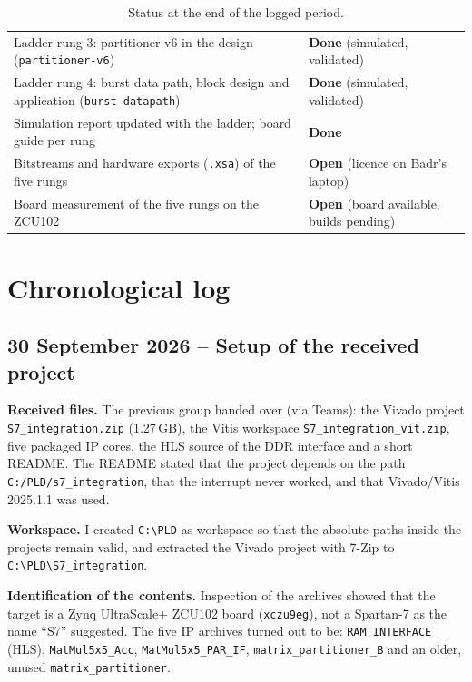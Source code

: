 \documentclass[11pt,a4paper]{article}
\newcommand{\code}[1]{\texttt{#1}}
\newcommand{\ok}{\textcolor{okgreen}{\textbf{Done}}}
\newcommand{\open}{\textcolor{warnorange}{\textbf{Open}}}
\begin{document}
\begin{table}[H]
\begin{tabularx}{\textwidth}{@{}Yl@{}}
Ladder rung 3: partitioner v6 in the design (\code{partitioner-v6}) & \ok{} (simulated, validated) \\
Ladder rung 4: burst data path, block design and application (\code{burst-datapath}) & \ok{} (simulated, validated) \\
Simulation report updated with the ladder; board guide per rung & \ok \\
Bitstreams and hardware exports (\code{.xsa}) of the five rungs & \open{} (licence on Badr's laptop) \\
Board measurement of the five rungs on the ZCU102 & \open{} (board available, builds pending) \\
\bottomrule
\end{tabularx}
\caption{Status at the end of the logged period.}
\end{table}

\section{Chronological log}

\subsection{30 September 2026 -- Setup of the received project}
\textbf{Received files.} The previous group handed over (via Teams): the Vivado project \code{S7\_integration.zip} (1.27\,GB), the Vitis workspace \code{S7\_integration\_vit.zip}, five packaged IP cores, the HLS source of the DDR interface and a short README. The README stated that the project depends on the path \code{C:/PLD/s7\_integration}, that the interrupt never worked, and that Vivado/Vitis 2025.1.1 was used.

\textbf{Workspace.} I created \code{C:\textbackslash PLD} as workspace so that the absolute paths inside the projects remain valid, and extracted the Vivado project with 7-Zip to \code{C:\textbackslash PLD\textbackslash S7\_integration}.

\textbf{Identification of the contents.} Inspection of the archives showed that the target is a Zynq UltraScale+ ZCU102 board (\code{xczu9eg}), not a Spartan-7 as the name ``S7'' suggested. The five IP archives turned out to be: \code{RAM\_INTERFACE} (HLS), \code{MatMul5x5\_Acc}, \code{MatMul5x5\_PAR\_IF}, \code{matrix\_partitioner\_B} and an older, unused \code{matrix\_partitioner}.
\end{document}
